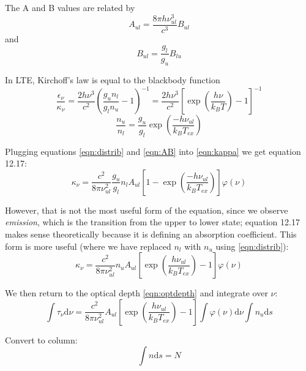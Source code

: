 \documentclass[preprint]{aastex}
\newcommand{\ds}{\ensuremath{\textrm{d}s}}
\newcommand{\dnu}{\ensuremath{\textrm{d}\nu}}
\begin{document}
The A and B values are related by
\begin{equation}
  \label{eqn:AB}
  A_{ul} = \frac{8\pi h \nu_{ul}^3}{c^3} B_{ul}
\end{equation}
and \begin{equation} B_{ul} = \frac{g_l}{g_u} B_{lu} \end{equation}

In LTE, Kirchoff's law is equal to the blackbody function \citep[][eqns 1.14, 12.8, 12.9]{rohlfs}
\begin{equation}
  \frac{\epsilon_\nu}{\kappa_\nu} = \frac{2 h \nu^3}{c^2} \left(\frac{g_u n_l}{g_l n_u} - 1 \right)^{-1}
                                  = \frac{2 h \nu^3}{c^2} \left[\exp\left(\frac{h\nu}{k_B T}\right) - 1\right]^{-1}
\end{equation}
\begin{equation}
  \label{eqn:distrib}
  \frac{n_u}{n_l} = \frac{g_u}{g_l} \exp\left(\frac{-h \nu_{ul} }{k_B T_{ex}}\right) 
\end{equation}

Plugging equations \eqref{eqn:distrib} and \eqref{eqn:AB} into \eqref{eqn:kappa} we get \citet{rohlfs} equation 12.17:
\begin{equation}
  \kappa_\nu = \frac{c^2}{8 \pi \nu_{ul}^2} \frac{g_u}{g_l} n_l A_{ul} \left[1-\exp\left(\frac{-h \nu_{ul} }{k_B T_{ex}}\right) \right] \varphi(\nu)
\end{equation}

However, that is not the most useful form of the equation, since we observe
\emph{emission}, which is the transition from the upper to lower state;
equation 12.17 makes sense theoretically because it is defining an absorption
coefficient.  This form is more useful (where we have replaced $n_l$ with $n_u$ using \eqref{eqn:distrib}):
\begin{equation}
  \kappa_\nu = \frac{c^2}{8 \pi \nu_{ul}^2} n_u A_{ul} \left[\exp\left(\frac{h \nu_{ul} }{k_B T_{ex}}\right) - 1 \right] \varphi(\nu)
\end{equation}

We then return to the optical depth \eqref{eqn:optdepth} and integrate over $\nu$:
\begin{equation}
  \int \tau_\nu \dnu = \frac{c^2}{8 \pi \nu_{ul}^2} A_{ul} \left[\exp\left(\frac{h \nu_{ul} }{k_B T_{ex}}\right) - 1 \right] \int \varphi(\nu) \dnu \int n_u \ds 
\end{equation}
\citep[$\int\varphi(\nu) \dnu \equiv 1$][eqn 12.1]{rohlfs}

Convert to column:
\begin{equation}
  \int n \ds = N
\end{equation}
\end{document}
